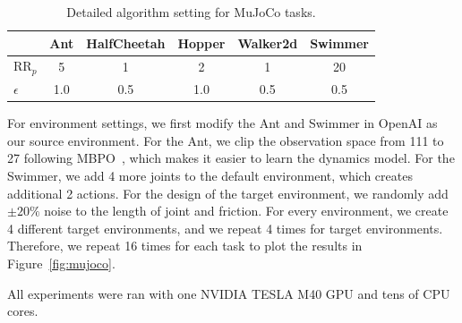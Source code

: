 \documentclass[letterpaper]{article} %
\begin{document}
\begin{table}[h]
\caption{Detailed algorithm setting for MuJoCo tasks.}
\label{tb:setting_mujoco}
\centering
\begin{tabular}{l|ccccc}
\hline
                 & Ant & HalfCheetah & Hopper & Walker2d & Swimmer \\
\hline
 $\mathrm{RR}_p$ & 5   & 1   & 2   &  1    & 20\\
 $\epsilon$      & 1.0 & 0.5 & 1.0 &  0.5  & 0.5     \\
\hline
\end{tabular}
\end{table}

For environment settings, we first modify the Ant and Swimmer in OpenAI as our source environment.
For the Ant, we clip the observation space from 111 to 27 following MBPO~\cite{janner2019trust}, 
which makes it easier to learn the dynamics model.
For the Swimmer, we add 4 more joints to the default environment, which creates additional 2 actions.
For the design of the target environment, we randomly add $\pm20\%$ noise to the length of joint and friction.
For every environment, we create 4 different target environments, and we repeat 4 times for target environments.
Therefore, we repeat 16 times for each task to plot the results in Figure~\ref{fig:mujoco}.

All experiments were ran with one NVIDIA TESLA M40 GPU and tens of CPU cores.
\end{document}
